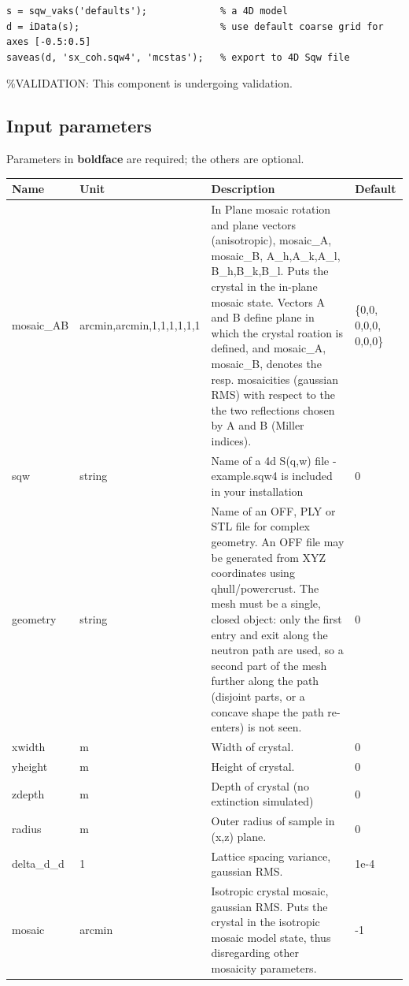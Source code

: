 \begin{verbatim}
s = sqw_vaks('defaults');             % a 4D model
d = iData(s);                         % use default coarse grid for axes [-0.5:0.5]
saveas(d, 'sx_coh.sqw4', 'mcstas');   % export to 4D Sqw file
\end{verbatim}

\%VALIDATION: This component is undergoing validation.

\subsection*{Input parameters}
Parameters in \textbf{boldface} are required; the others are optional.

\begin{longtable}{p{}p{}p{}p{}}
\toprule
\textbf{Name} & \textbf{Unit} & \textbf{Description} & \textbf{Default} \\
\midrule
\endhead
mosaic\_AB & arcmin,arcmin,1,1,1,1,1,1 & In Plane mosaic rotation and plane vectors (anisotropic), mosaic\_A, mosaic\_B, A\_h,A\_k,A\_l, B\_h,B\_k,B\_l. Puts the crystal in the in-plane mosaic state. Vectors A and B define plane in which the crystal roation is defined, and mosaic\_A, mosaic\_B, denotes the resp. mosaicities (gaussian RMS) with respect to the the two reflections chosen by A and B (Miller indices). & \{0,0, 0,0,0, 0,0,0\} \\
sqw & string & Name of a 4d S(q,w) file - example.sqw4 is included in your installation & 0 \\
geometry & string & Name of an OFF, PLY or STL file for complex geometry. An OFF file may be generated from XYZ coordinates using qhull/powercrust. The mesh must be a single, closed object: only the first entry and exit along the neutron path are used, so a second part of the mesh further along the path (disjoint parts, or a concave shape the path re-enters) is not seen. & 0 \\
xwidth & m & Width of crystal. & 0 \\
yheight & m & Height of crystal. & 0 \\
zdepth & m & Depth of crystal (no extinction simulated) & 0 \\
radius & m & Outer radius of sample in (x,z) plane. & 0 \\
delta\_d\_d & 1 & Lattice spacing variance, gaussian RMS. & 1e-4 \\
mosaic & arcmin & Isotropic crystal mosaic, gaussian RMS. Puts the crystal in the isotropic mosaic model state, thus disregarding other mosaicity parameters. & -1 \\

\end{longtable}
